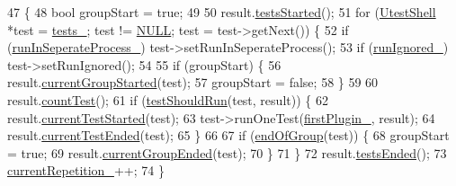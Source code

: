 \begin{DoxyCode}
47 \{
48     \textcolor{keywordtype}{bool} groupStart = \textcolor{keyword}{true};
49 
50     result.\hyperlink{class_test_result_aeb31f6af6445d908cb9dd8c91fd2ddf1}{testsStarted}();
51     \textcolor{keywordflow}{for} (\hyperlink{class_utest_shell}{UtestShell} *test = \hyperlink{class_test_registry_ac25160ebe0919f203197a4c65a72b02e}{tests\_}; test != \hyperlink{openavb__types__base__pub_8h_a070d2ce7b6bb7e5c05602aa8c308d0c4}{NULL}; test = test->getNext()) \{
52         \textcolor{keywordflow}{if} (\hyperlink{class_test_registry_afa76b0521126a402ac5587199151acd5}{runInSeperateProcess\_}) test->setRunInSeperateProcess();
53         \textcolor{keywordflow}{if} (\hyperlink{class_test_registry_a9aedd4f11eb25d8bd013c2463fccfea6}{runIgnored\_}) test->setRunIgnored();
54 
55         \textcolor{keywordflow}{if} (groupStart) \{
56             result.\hyperlink{class_test_result_a97d22b8a6b437f264c4913eb7c4ec540}{currentGroupStarted}(test);
57             groupStart = \textcolor{keyword}{false};
58         \}
59 
60         result.\hyperlink{class_test_result_a3ab54ad0444bf424ff50427e9f20a01c}{countTest}();
61         \textcolor{keywordflow}{if} (\hyperlink{class_test_registry_a1a8176b8ede17cf96ba1ed88dfa3bc0c}{testShouldRun}(test, result)) \{
62             result.\hyperlink{class_test_result_a83eaf7a8fb7f2f528bca8afe5abf55c4}{currentTestStarted}(test);
63             test->runOneTest(\hyperlink{class_test_registry_a87b15684d847549532b2219d0e4d3d83}{firstPlugin\_}, result);
64             result.\hyperlink{class_test_result_ab6c4a307a4b8703215c519e1110d92c9}{currentTestEnded}(test);
65         \}
66 
67         \textcolor{keywordflow}{if} (\hyperlink{class_test_registry_aa7701b12c9e4e2e4e60b886234c329f1}{endOfGroup}(test)) \{
68             groupStart = \textcolor{keyword}{true};
69             result.\hyperlink{class_test_result_a9373b80002f576f0328c80f3c7571c8a}{currentGroupEnded}(test);
70         \}
71     \}
72     result.\hyperlink{class_test_result_a47626fc9f8f52cc2b188a9f94a72f598}{testsEnded}();
73     \hyperlink{class_test_registry_a7f21fe6b11eb96d498bb1890f70932de}{currentRepetition\_}++;
74 \}
\end{DoxyCode}


